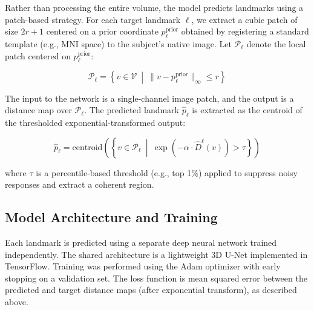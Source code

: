 Rather than processing the entire volume, the model predicts landmarks using a patch-based strategy. For each target landmark $\ell$, we extract a cubic patch of size $2r+1$ centered on a prior coordinate $p_\ell^{\text{prior}}$ obtained by registering a standard template (e.g., MNI space) to the subject’s native image. Let $\mathcal{P}_\ell$ denote the local patch centered on $p_\ell^{\text{prior}}$:

\begin{equation}
\mathcal{P}_\ell = \left\{ v \in \mathcal{V} \ \middle|\ \lVert v - p_\ell^{\text{prior}} \rVert_\infty \leq r \right\}
\end{equation}

The input to the network is a single-channel image patch, and the output is a distance map over $\mathcal{P}_\ell$. The predicted landmark $\hat{p}_\ell$ is extracted as the centroid of the thresholded exponential-transformed output:

\begin{equation}
\hat{p}_\ell = \text{centroid} \left( \left\{ v \in \mathcal{P}_\ell \ \middle|\ \exp(-\alpha \cdot \hat{D}^\ell(v)) > \tau \right\} \right)
\end{equation}

where $\tau$ is a percentile-based threshold (e.g., top 1\%) applied to suppress noisy responses and extract a coherent region.

\subsection{Model Architecture and Training}

Each landmark is predicted using a separate deep neural network trained independently. The shared architecture is a lightweight 3D U-Net implemented in TensorFlow. Training was performed using the Adam optimizer with early stopping on a validation set. The loss function is mean squared error between the predicted and target distance maps (after exponential transform), as described above.

